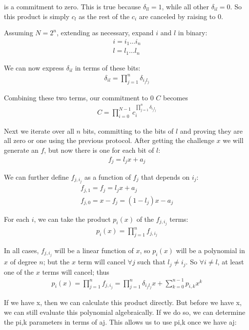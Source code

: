 \documentclass{article}
\begin{document}
is a commitment to zero.  This is true because $\delta_{ll} = 1$, while all other $\delta_{il} = 0$. So this product is simply $c_l$ as the rest of the $c_i$ are canceled by raising to $0$.

Assuming $N = 2^n$, extending as necessary, expand $i$ and $l$ in binary:
\begin{eqnarray}
  i = i_1...i_n\\
  l = l_1...l_n
\end{eqnarray}

We can now express $\delta_{il}$ in terms of these bits:
\begin{eqnarray}
  \delta_{il} = \prod_{j=1}^{n} \delta_{i_jl_j}
\end{eqnarray}
  
Combining these two terms, our commitment to $0$ $C$ becomes
\begin{eqnarray}
  C = \prod_{i=0}^{N-1}c_i^{\prod_{j=1}^{n} \delta_{i_jl_j}}
\end{eqnarray}

Next we iterate over all $n$ bits, committing to the bits of $l$ and proving they are all zero or one using the previous protocol.  After getting the challenge $x$ we will generate an $f$, but now there is one for each bit of $l$:
\begin{eqnarray}
  f_j = l_j x + a_j
\end{eqnarray}

We can further define $f_{j, i_j}$ as a function of $f_j$ that depends on $i_j$:
\begin{eqnarray}
  f_{j,1} = f_j = l_j x + a_j\\
  f_{j,0} = x - f_j = (1 - l_j) x - a_j
\end{eqnarray}

For each $i$, we can take the product $p_i(x)$ of the $f_{j, i_j}$ terms:
\begin{eqnarray}
  p_i(x) = \prod_{j=1}^{n} f_{j, i_j}
\end{eqnarray}

In all cases, $f_{j, i_j}$ will be a linear function of $x$, so $p_i(x)$ will be a polynomial in $x$ of degree $n$; but the $x$ term will cancel $\forall j$ such that $l_j \ne i_j$.  So $\forall i \ne l$, at least one of the $x$ terms will cancel; thus
\begin{eqnarray}
  p_i(x) = \prod_{j=1}^n f_{j,i_j} = {\prod_{j=1}^{n}\delta_{i_jl_j} x} + \sum_{k=0}^{n-1}{p_{i,k} x^k}
\end{eqnarray}

If we have x, then we can calculate this product directly.  But before we have x, we can still evaluate this polynomial algebraically.  If we do so, we can determine the pi,k parameters in terms of aj.  This allows us to use pi,k once we have aj:
\end{document}
